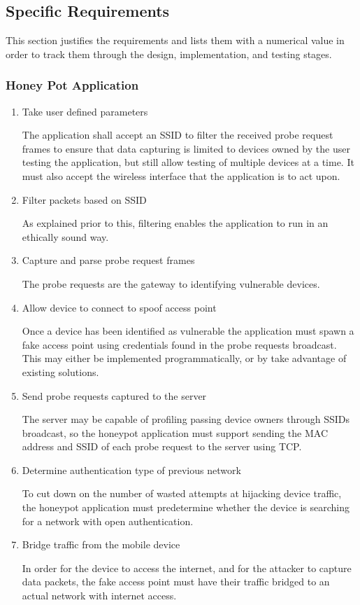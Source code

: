 \subsection{Specific Requirements}
This section justifies the requirements and lists them with a numerical value in order to track them through the design, implementation, and testing stages.

\label{requirements:specific}
\subsubsection{Honey Pot Application}
\begin{enumerate}
\item Take user defined parameters

The application shall accept an SSID to filter the received probe request frames to ensure that data capturing is limited to devices owned by the user testing the application, but still allow testing of multiple devices at a time. It must also accept the wireless interface that the application is to act upon.

\item Filter packets based on SSID

As explained prior to this, filtering enables the application to run in an ethically sound way.

\item Capture and parse probe request frames

The probe requests are the gateway to identifying vulnerable devices.

\item Allow device to connect to spoof access point

Once a device has been identified as vulnerable the application must spawn a fake access point using credentials found in the probe requests broadcast. This may either be implemented programmatically, or by take advantage of existing solutions.

\item Send probe requests captured to the server

The server may be capable of profiling passing device owners through SSIDs broadcast, so the honeypot application must support sending the MAC address and SSID of each probe request to the server using TCP.

\item Determine authentication type of previous network

To cut down on the number of wasted attempts at hijacking device traffic, the honeypot application must predetermine whether the device is searching for a network with open authentication.

\item  Bridge traffic from the mobile device

In order for the device to access the internet, and for the attacker to capture data packets, the fake access point must have their traffic bridged to an actual network with internet access.
\end{enumerate}

